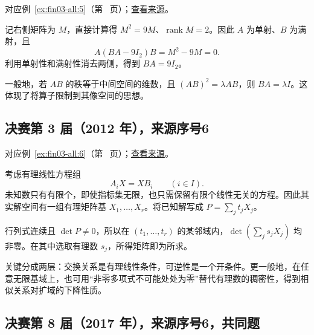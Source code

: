\documentclass[UTF8,12pt,a4paper,fontset=fandol]{ctexart}
\begin{document}
对应例~\ref{ex:fin03-all:5}（第~\pageref{ex:fin03-all:5} 页）；\href{https://github.com/lzxcr/cmc-mathematics/blob/64916fa1fdbc3e444a652eca204d5669058ee321/src/problems/finals/03/05.md}{查看来源}。

\begin{solve}

记右侧矩阵为 $M$，直接计算得 $M^2=9M$、$\operatorname{rank}M=2$。因此 $A$ 为单射、$B$ 为满射，且
\[
A(BA-9I_2)B=M^2-9M=0.
\]
利用单射性和满射性消去两侧，得到 $BA=9I_2$。

\end{solve}

\begin{remark}[方法与条件]

一般地，若 $AB$ 的秩等于中间空间的维数，且 $(AB)^2=\lambda AB$，则 $BA=\lambda I$。这体现了将算子限制到其像空间的思想。

\end{remark}

\subsection{决赛第 3 届（2012 年），来源序号6}\label{ans:fin03-all:6}\label{pr:fin03-all:6}

对应例~\ref{ex:fin03-all:6}（第~\pageref{ex:fin03-all:6} 页）；\href{https://github.com/lzxcr/cmc-mathematics/blob/64916fa1fdbc3e444a652eca204d5669058ee321/src/problems/finals/03/06.md}{查看来源}。

\begin{solve}

考虑有理线性方程组
\[
A_iX=XB_i\qquad(i\in I).
\]
未知数只有有限个，即使指标集无限，也只需保留有限个线性无关的方程。因此其实解空间有一组有理矩阵基 $X_1,\ldots,X_r$。将已知解写成
$P=\sum_j t_jX_j$。

行列式连续且 $\det P\ne0$，所以在 $(t_1,\ldots,t_r)$ 的某邻域内，$\det(\sum_j s_jX_j)$ 均非零。在其中选取有理数 $s_j$，所得矩阵即为所求。

\end{solve}

\begin{remark}[方法与条件]

关键分成两层：交换关系是有理线性条件，可逆性是一个开条件。更一般地，在任意无限基域上，也可用“非零多项式不可能处处为零”替代有理数的稠密性，得到相似关系对扩域的下降性质。

\end{remark}

\subsection{决赛第 8 届（2017 年），来源序号6，共同题}\label{ans:fin08-hi:6}\label{pr:fin08-hi:6}
\end{document}
